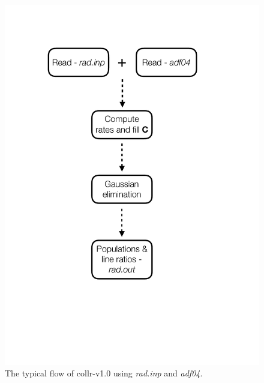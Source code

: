 %
\begin{figure}
\centering
\includegraphics[scale=0.6]{Figures/Spectral/rad_flow.pdf}
\caption{The typical flow of {\sc collr-v1.0} using \textit{rad.inp} and \textit{adf04}. \label{fig:spe_flow}}
\end{figure}
%

